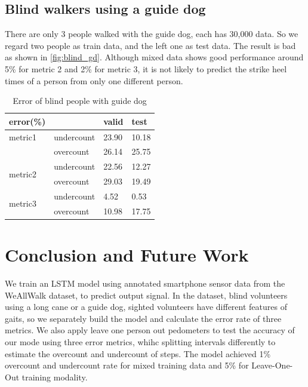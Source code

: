 \documentclass[11pt]{article}
\begin{document}
{\subsection{Blind walkers using a guide dog}

There are only 3 people walked with the guide dog, each has 30,000 data. So we regard two people as train data, and the left one as test data. The result is bad as shown in \ref{fig:blind_gd}. Although mixed data shows good performance around 5\% for metric 2 and 2\% for metric 3, it is not likely to predict the strike heel times of a person from only one different person.

\begin{table}[]
\centering
\caption{Error of blind people with guide dog}
\label{my-label}
\begin{tabular}{llll}
\hline
error(\%)                &            & valid & test  \\ \hline
metric1                  & undercount & 23.90 & 10.18 \\
                         & overcount  & 26.14 & 25.75 \\ \hline
\multirow{2}{*}{metric2} & undercount & 22.56 & 12.27 \\
                         & overcount  & 29.03 & 19.49 \\ \hline
\multirow{2}{*}{metric3} & undercount & 4.52  & 0.53  \\
                         & overcount  & 10.98 & 17.75 \\ \hline
\end{tabular}
\end{table}


\section{Conclusion and Future Work}

We train an LSTM model using annotated smartphone sensor data from the WeAllWalk dataset, to predict output signal. In the dataset, blind volunteers using a long cane or a guide dog, sighted volunteers have different features of gaits, so we separately build the model and calculate the error rate of three metrics. We also apply leave one person out pedometers to test the accuracy of our mode using three error metrics, whihc splitting intervals differently to estimate the overcount and undercount of steps.  The model achieved 1\% overcount and undercount rate for mixed training data and 5\% for Leave-One-Out training modality.

}
\end{document}
